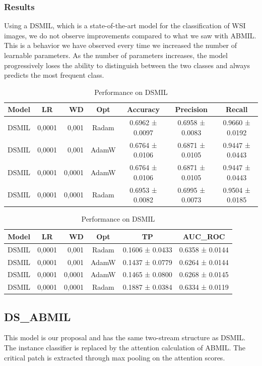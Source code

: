 \documentclass{article}
\begin{document}
\clearpage
\subsubsection{Results}
Using a DSMIL, which is a state-of-the-art model for the classification of WSI images, we do not observe improvements compared to what we saw with ABMIL. This is a behavior we have observed every time we increased the number of learnable parameters. As the number of parameters increases, the model progressively loses the ability to distinguish between the two classes and always predicts the most frequent class.

\begin{table}[h]
	\centering
	\begin{tabular}{|c|crc|c|c|c|}
		\hline
		Model & LR & WD & Opt & Accuracy & Precision & Recall \\
		\hline
		DSMIL & 0,0001 & 0,001 & Radam & 0.6962 ± 0.0097 & 0.6958 ± 0.0083 & 0.9660 ± 0.0192 \\
		DSMIL & 0,0001 & 0,001 & AdamW & 0.6764 ± 0.0106 & 0.6871 ± 0.0105 & 0.9447 ± 0.0443 \\
		DSMIL & 0,0001 & 0,0001 & AdamW & 0.6764 ± 0.0106 & 0.6871 ± 0.0105 & 0.9447 ± 0.0443 \\
		DSMIL & 0,0001 & 0,0001 & Radam & 0.6953 ± 0.0082 & 0.6995 ± 0.0073 & 0.9504 ± 0.0185 \\
		\hline
	\end{tabular}
	\centering
	\begin{tabular}{|c|crc|c|c|}
		\hline
		Model & LR & WD & Opt & TP & AUC\_ROC \\
		\hline
		DSMIL & 0,0001 & 0,001 & Radam & 0.1606 ± 0.0433 & 0.6358 ± 0.0144 \\
		DSMIL & 0,0001 & 0,001 & AdamW & 0.1437 ± 0.0779 & 0.6264 ± 0.0144 \\
		DSMIL & 0,0001 & 0,0001 & AdamW & 0.1465 ± 0.0800 & 0.6268 ± 0.0145 \\
		DSMIL & 0,0001 & 0,0001 & Radam & 0.1887 ± 0.0384 & 0.6334 ± 0.0119 \\
		\hline
	\end{tabular}

	\caption{Performance on DSMIL}
\end{table}

\clearpage

\subsection{DS\_ABMIL}
This model is our proposal and has the same two-stream structure as DSMIL. The instance classifier is replaced by the attention calculation of ABMIL. The critical patch is extracted through max pooling on the attention scores.
\end{document}
